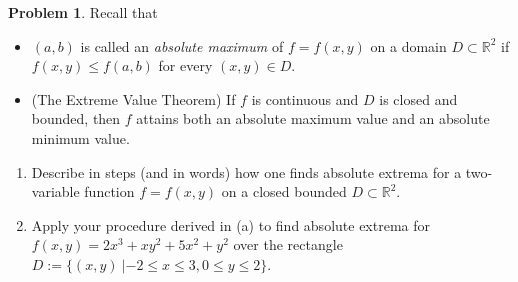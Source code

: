 \documentclass[12pt]{article}
\theoremstyle{definition}
\newtheorem{problem}{Problem}
\begin{document}
\begin{problem}
  Recall that
  \begin{itemize}
    \item $(a, b)$ is called an \textit{absolute maximum} of $f = f(x, y)$ on a domain
      $D \subset \mathbb{R}^2$ if $f(x, y) \leq f(a, b)$
      for every $(x, y) \in D$.
    \item (The Extreme Value Theorem) If $f$ is continuous and $D$ is closed and bounded,
      then $f$ attains both an absolute maximum value and an absolute minimum value.
  \end{itemize}
  \begin{enumerate}
    \item Describe in steps (and in words) how one finds absolute extrema for a two-variable
      function $f = f(x, y)$ on a closed bounded $D \subset \mathbb{R}^2$.
    \item Apply your procedure derived in (a) to find absolute extrema for
      $f(x, y) = 2x^3 + xy^2 + 5x^2 + y^2$
      over the rectangle $D := \{(x, y)\ | -2 \leq x \leq 3, 0 \leq y \leq 2\}$.
  \end{enumerate}
\end{problem}
\end{document}
